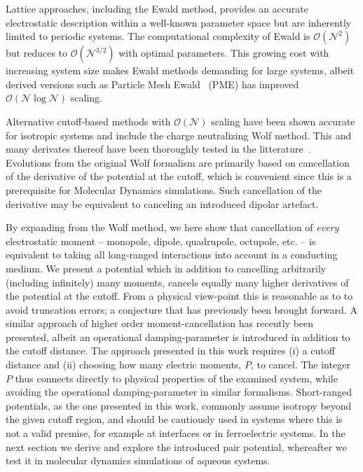 \documentclass[
journal=jctcce,
manuscript=letter]{achemso}
\begin{document}
Lattice approaches, including the Ewald method\cite{ewald1921berechnung,kornfeld1924berechnung}, provides an accurate electrostatic description within a well-known parameter space\cite{kolafa1992cutoff,wang2001estimate} but are inherently limited to periodic systems.
The computational complexity of Ewald is $\mathcal{O}(\mathcal{N}^2)$ but reduces to $\mathcal{O}(\mathcal{N}^{3/2})$ with optimal parameters.
This growing cost with increasing system size makes Ewald methods demanding for large systems, albeit derived versions such as Particle Mesh Ewald~\cite{PME} (PME) has improved $\mathcal{O}(\mathcal{N}\log\mathcal{N})$ scaling.

Alternative cutoff-based methods with $\mathcal{O}(\mathcal{N})$ scaling have been shown accurate for isotropic systems and include the charge neutralizing Wolf method\cite{wolf1999exact}.
This and many derivates thereof have been thoroughly tested in the litterature~\cite{demontis2001application,zahn2002enhancement,Fennell2006,fanourgakis2009fast}.
Evolutions from the original Wolf formalism are primarily based on cancellation of the derivative of the potential at the cutoff, which is convenient since this is a prerequisite for Molecular Dynamics simulations.
Such cancellation of the derivative may be equivalent to canceling an introduced dipolar artefact\cite{Fukuda2011Molecular}.

By expanding from the Wolf method, we here show that cancellation of \emph{every} electrostatic moment -- monopole, dipole, quadrupole, octupole, etc. -- is equivalent to taking all long-ranged interactions into account in a conducting medium.
We present a potential which in addition to cancelling arbitrarily (including infinitely) many moments, cancels equally many higher derivatives of the potential at the cutoff.
From a physical view-point this is reasonable as to to avoid truncation errors; a conjecture that has previously been brought forward\cite{zahn2002enhancement}.
A similar approach of higher order moment-cancellation has recently been presented\cite{fukuda2013zero}, albeit an operational damping-parameter is introduced in addition to the cutoff distance.
The approach presented in this work requires
(i) a cutoff distance and
(ii) choosing how many electric moments, $P$, to cancel.
The integer $P$ thus connects directly to physical properties of the examined system, while avoiding the operational damping-parameter in similar formalisms.
Short-ranged potentials, as the one presented in this work, commonly assume isotropy beyond the given cutoff region, and should be cautiously used in systems where this is not a valid premise, for example at interfaces\cite{mendoza2008wolf} or in ferroelectric systems.
In the next section we derive and explore the introduced pair potential, whereafter we test it in molecular dynamics simulations of aqueous systems.
\end{document}

